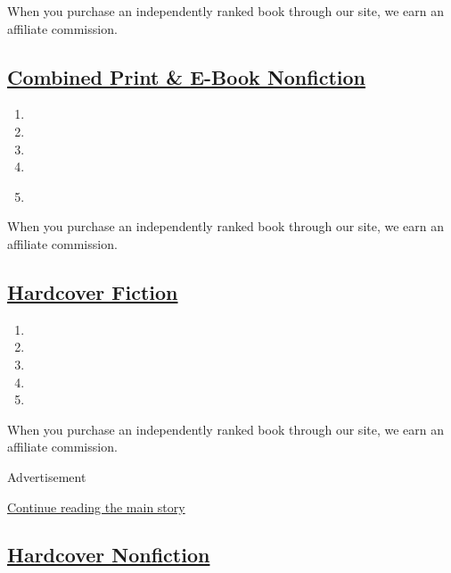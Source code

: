 When you purchase an independently ranked book through our site, we earn
an affiliate commission.

\hypertarget{combined-print--e-book-nonfiction}{%
\subsection{\texorpdfstring{\href{/books/best-sellers/combined-print-and-e-book-nonfiction/}{Combined
Print \& E-Book
Nonfiction}}{Combined Print \& E-Book Nonfiction}}\label{combined-print--e-book-nonfiction}}

\begin{enumerate}
\def\labelenumi{\arabic{enumi}.}
\tightlist
\item
\item
\item
\item
\item
  \href{https://www.nytimes.com/2019/08/20/books/review/how-to-be-an-antiracist-ibram-x-kendi.html}{}
\end{enumerate}

When you purchase an independently ranked book through our site, we earn
an affiliate commission.

\hypertarget{hardcover-fiction}{%
\subsection{\texorpdfstring{\href{/books/best-sellers/hardcover-fiction/}{Hardcover
Fiction}}{Hardcover Fiction}}\label{hardcover-fiction}}

\begin{enumerate}
\def\labelenumi{\arabic{enumi}.}
\tightlist
\item
\item
\item
\item
\item
\end{enumerate}

When you purchase an independently ranked book through our site, we earn
an affiliate commission.

Advertisement

\protect\hyperlink{after-mid1}{Continue reading the main story}

\hypertarget{hardcover-nonfiction}{%
\subsection{\texorpdfstring{\href{/books/best-sellers/hardcover-nonfiction/}{Hardcover
Nonfiction}}{Hardcover Nonfiction}}\label{hardcover-nonfiction}}

